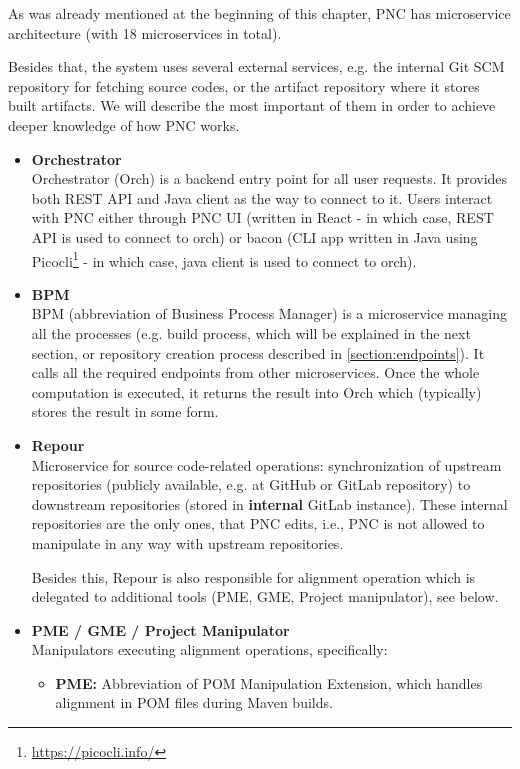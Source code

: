 \documentclass[../main.tex]{subfiles}
\begin{document}
As was already mentioned at the beginning of this chapter, PNC has microservice architecture (with 18 microservices in total).

Besides that, the system uses several external services, e.g. the internal Git SCM repository for fetching source codes, or the artifact repository where it stores built artifacts. We will describe the most important of them in order to achieve deeper knowledge of how PNC works.

\begin{itemize}
    \item \textbf{Orchestrator}\\
    Orchestrator (Orch) is a backend entry point for all user requests. It provides both REST API and Java client as the way to connect to it. Users interact with PNC either through PNC UI (written in React - in which case, REST API is used to connect to orch) or bacon (CLI app written in Java using Picocli\footnote{\url{https://picocli.info/}} - in which case, java client is used to connect to orch).

    \item \textbf{BPM}\\
    BPM (abbreviation of Business Process Manager) is a microservice managing all the processes (e.g. build process, which will be explained in the next section, or repository creation process described in \ref{section:endpoints}). It calls all the required endpoints from other microservices. Once the whole computation is executed, it returns the result into Orch which (typically) stores the result in some form.

    \item \textbf{Repour}\\
    Microservice for source code-related operations: synchronization of upstream repositories (publicly available, e.g. at GitHub or GitLab repository) to downstream repositories (stored in \textbf{internal} GitLab instance). These internal repositories are the only ones, that PNC edits, i.e., PNC is not allowed to manipulate in any way with upstream repositories.
    
    Besides this, Repour is also responsible for alignment operation which is delegated to additional tools (PME, GME, Project manipulator), see below.

    \item \textbf{PME / GME / Project Manipulator}\\
    Manipulators executing alignment operations, specifically:
    \begin{itemize}
        \item \textbf{PME:} Abbreviation of POM Manipulation Extension, which handles alignment in POM files during Maven builds.


\end{itemize}
\end{itemize}
\end{document}
